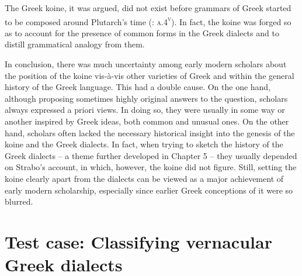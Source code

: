The Greek koine, it was argued, did not exist before grammars of Greek started to be composed around Plutarch’s time (\citealt{KirchmaierThryllitsch1709}: \textsc{a.4}\textsc{\textsuperscript{v}}). In fact, the koine was forged so as to account for the presence of common forms in the Greek dialects and to distill grammatical analogy from them.

In conclusion, there was much uncertainty among early modern scholars about the position of the koine vis-à-vis other varieties of Greek and within the general history of the Greek language. This had a double cause. On the one hand, although proposing sometimes highly original answers to the question, scholars always expressed a priori views. In doing so, they were usually in some way or another inspired by Greek ideas, both common and unusual ones. On the other hand, scholars often lacked the necessary historical insight into the genesis of the koine and the Greek dialects. In fact, when trying to sketch the history of the Greek dialects – a theme further developed in Chapter 5 – they usually depended on Strabo’s account, in which, however, the koine did not figure. Still, setting the koine clearly apart from the dialects can be viewed as a major achievement of early modern scholarship, especially since earlier Greek conceptions of it were so blurred.

\section{Test case: Classifying vernacular Greek dialects}

